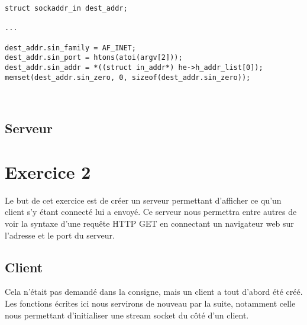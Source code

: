 \documentclass[a4paper, frenchb, 11pt]{article}
\begin{document}
\begin{lstlisting}
struct sockaddr_in dest_addr;

...

dest_addr.sin_family = AF_INET;
dest_addr.sin_port = htons(atoi(argv[2]));
dest_addr.sin_addr = *((struct in_addr*) he->h_addr_list[0]);
memset(dest_addr.sin_zero, 0, sizeof(dest_addr.sin_zero));
\end{lstlisting}
\


\subsection{Serveur}



\newpage

\section{Exercice 2}
Le but de cet exercice est de créer un serveur permettant d'afficher ce qu'un client s'y étant connecté lui a envoyé. Ce serveur nous permettra entre autres de voir la syntaxe d'une requête HTTP GET en connectant un navigateur web sur l'adresse et le port du serveur.

\subsection{Client}
Cela n'était pas demandé dans la consigne, mais un client a tout d'abord été créé. Les fonctions écrites ici nous servirons de nouveau par la suite, notamment celle nous permettant d'initialiser une stream socket du côté d'un client.\\
\end{document}

